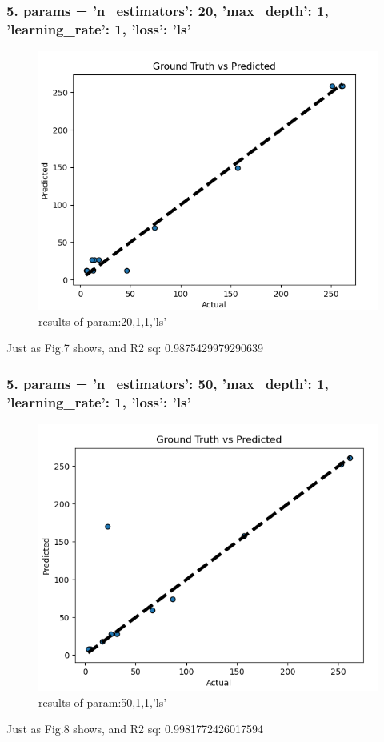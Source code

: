\documentclass[a4paper,12pt]{journal}
\begin{document}
	\subsubsection*{5. params = {'n\_estimators': 20, 'max\_depth': 1, 'learning\_rate': 1, 'loss': 'ls'}}
	\begin{figure}[htbp]
		\centering
		\includegraphics[scale=0.8]{1_c_5.png}
		\caption{results of param:20,1,1,'ls'}
	\end{figure}
	Just as Fig.7 shows, and R2 sq:  0.9875429979290639
	\subsubsection*{5. params = {'n\_estimators': 50, 'max\_depth': 1, 'learning\_rate': 1, 'loss': 'ls'}}
	\begin{figure}[htbp]
		\centering
		\includegraphics[scale=0.8]{1_c_6.png}
		\caption{results of param:50,1,1,'ls'}
	\end{figure}
	Just as Fig.8 shows, and R2 sq:  0.9981772426017594
\end{document}
